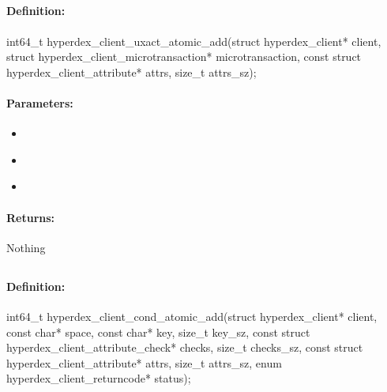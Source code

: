 \pagebreak
\subsection{}
\label{api:c:uxact_atomic_add}


\paragraph{Definition:}
\begin{ccode}
int64_t hyperdex_client_uxact_atomic_add(struct hyperdex_client* client,
        struct hyperdex_client_microtransaction* microtransaction,
        const struct hyperdex_client_attribute* attrs, size_t attrs_sz);
\end{ccode}

\paragraph{Parameters:}
\begin{itemize}[noitemsep]
\item {}\\

\item {}\\

\item {}\\

\end{itemize}

\paragraph{Returns:}
Nothing
\pagebreak
\subsection{}
\label{api:c:cond_atomic_add}


\paragraph{Definition:}
\begin{ccode}
int64_t hyperdex_client_cond_atomic_add(struct hyperdex_client* client,
        const char* space,
        const char* key, size_t key_sz,
        const struct hyperdex_client_attribute_check* checks, size_t checks_sz,
        const struct hyperdex_client_attribute* attrs, size_t attrs_sz,
        enum hyperdex_client_returncode* status);
\end{ccode}

